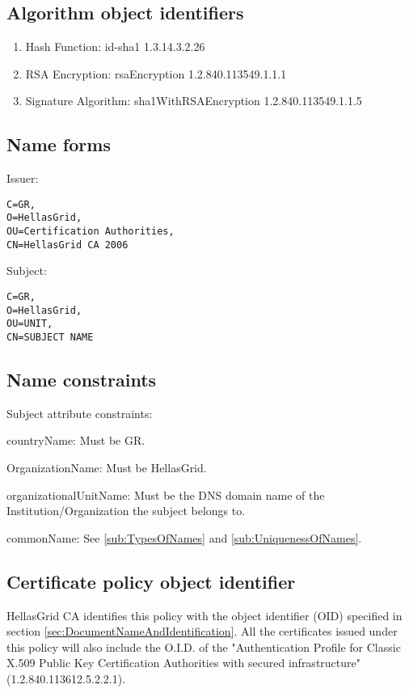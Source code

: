 \subsection{Algorithm object identifiers}

\begin{enumerate}
\item{Hash Function: id-sha1 1.3.14.3.2.26}
\item{RSA Encryption: rsaEncryption 1.2.840.113549.1.1.1}
\item{Signature Algorithm: sha1WithRSAEncryption 1.2.840.113549.1.1.5}
\end{enumerate}

\subsection{Name forms}

Issuer:

\begin{verbatim}
C=GR,
O=HellasGrid,
OU=Certification Authorities,
CN=HellasGrid CA 2006
\end{verbatim}

Subject:

\begin{verbatim}
C=GR,
O=HellasGrid,
OU=UNIT,
CN=SUBJECT NAME
\end{verbatim}

\subsection{Name constraints}

Subject attribute constraints:

countryName:
Must be GR.

OrganizationName:
Must be HellasGrid.

organizationalUnitName:
Must be the DNS domain name of the Institution/Organization the subject belongs to.

commonName:
See \ref{sub:TypesOfNames} and \ref{sub:UniquenessOfNames}.


\subsection{Certificate policy object identifier}

HellasGrid CA identifies this policy with the object identifier (OID) specified in section \ref{sec:DocumentNameAndIdentification}.  All the certificates issued under this policy will also include the O.I.D. of the "Authentication Profile for Classic X.509 Public Key Certification Authorities with secured infrastructure" (1.2.840.113612.5.2.2.1).


